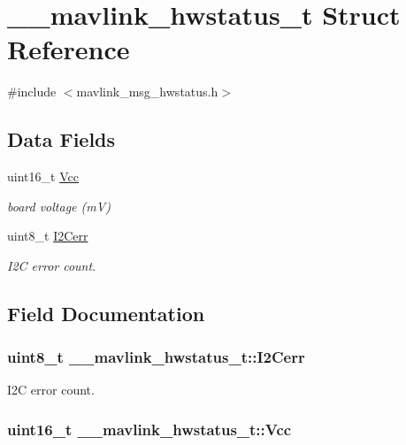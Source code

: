 \hypertarget{struct____mavlink__hwstatus__t}{\section{\+\_\+\+\_\+mavlink\+\_\+hwstatus\+\_\+t Struct Reference}
\label{struct____mavlink__hwstatus__t}
}


{\ttfamily \#include $<$mavlink\+\_\+msg\+\_\+hwstatus.\+h$>$}

\subsection*{Data Fields}
\begin{DoxyCompactItemize}
\item 
uint16\+\_\+t \hyperlink{struct____mavlink__hwstatus__t_a1b1aa2f29b095d28b23fdc095b4d49a8}{Vcc}
\begin{DoxyCompactList}\small\item\em board voltage (m\+V) \end{DoxyCompactList}\item 
uint8\+\_\+t \hyperlink{struct____mavlink__hwstatus__t_abe9a8709089a1d014a250a9bdf83e1cf}{I2\+Cerr}
\begin{DoxyCompactList}\small\item\em I2\+C error count. \end{DoxyCompactList}\end{DoxyCompactItemize}


\subsection{Field Documentation}
\hypertarget{struct____mavlink__hwstatus__t_abe9a8709089a1d014a250a9bdf83e1cf}{
\subsubsection[{I2\+Cerr}]{\setlength{\rightskip}{0pt plus 5cm}uint8\+\_\+t \+\_\+\+\_\+mavlink\+\_\+hwstatus\+\_\+t\+::\+I2\+Cerr}}\label{struct____mavlink__hwstatus__t_abe9a8709089a1d014a250a9bdf83e1cf}


I2\+C error count. 

\hypertarget{struct____mavlink__hwstatus__t_a1b1aa2f29b095d28b23fdc095b4d49a8}{
\subsubsection[{Vcc}]{\setlength{\rightskip}{0pt plus 5cm}uint16\+\_\+t \+\_\+\+\_\+mavlink\+\_\+hwstatus\+\_\+t\+::\+Vcc}}\label{struct____mavlink__hwstatus__t_a1b1aa2f29b095d28b23fdc095b4d49a8}


